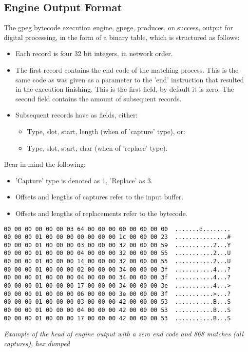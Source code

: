\subsection{Engine Output Format}

The gpeg bytecode execution engine, gpege, produces, on success, output for
digital processing, in the form of a binary table, which is structured
as follows:

\begin{itemize}

\item Each record is four 32 bit integers, in network order.

\item The first record contains the end code of the matching process.
This is the same code as was given as a parameter to the 'end'
instruction that resulted in the execution finishing. This is the
first field, by default it is zero.
The second field contains the amount of subsequent records.

\item Subsequent records have as fields, either:

\begin{itemize}
\item Type, slot, start, length (when of 'capture' type), or:
\item Type, slot, start, char (when of 'replace' type).
\end{itemize}

\end{itemize}

Bear in mind the following:

\begin{itemize}
\item 'Capture' type is denoted as 1, 'Replace' as 3.
\item Offsets and lengths of captures refer to the input buffer.
\item Offsets and lengths of replacements refer to the bytecode.
\end{itemize}

\begin{myquote}
\begin{verbatim}
00 00 00 00 00 00 03 64 00 00 00 00 00 00 00 00  .......d........
00 00 00 01 00 00 00 00 00 00 00 1c 00 00 00 23  ...............#
00 00 00 01 00 00 00 03 00 00 00 32 00 00 00 59  ...........2...Y
00 00 00 01 00 00 00 04 00 00 00 32 00 00 00 55  ...........2...U
00 00 00 01 00 00 00 14 00 00 00 32 00 00 00 55  ...........2...U
00 00 00 01 00 00 00 02 00 00 00 34 00 00 00 3f  ...........4...?
00 00 00 01 00 00 00 04 00 00 00 34 00 00 00 3f  ...........4...?
00 00 00 01 00 00 00 17 00 00 00 34 00 00 00 3e  ...........4...>
00 00 00 01 00 00 00 06 00 00 00 3e 00 00 00 3f  ...........>...?
00 00 00 01 00 00 00 03 00 00 00 42 00 00 00 53  ...........B...S
00 00 00 01 00 00 00 04 00 00 00 42 00 00 00 53  ...........B...S
00 00 00 01 00 00 00 17 00 00 00 42 00 00 00 53  ...........B...S
\end{verbatim}
\end{myquote}
\textit{Example of the head of engine output with a zero end code
and 868 matches (all captures), hex dumped}
